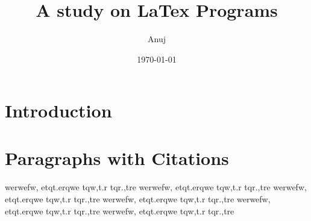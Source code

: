 \documentclass[10pt, a4paper]{article}
\begin{document}
\title{A study on LaTex Programs}
\author{Anuj}
\date{\today}
\maketitle
\section*{Introduction}
\lipsum[66]

\section{Paragraphs with Citations}
\paragraph{}
\lipsum[66] \cite{cite1} \lipsum[66] \cite{cite2} \lipsum[66] \cite{cite3} 

\paragraph{}
\lipsum[66] \cite{cite4} \lipsum[66] \cite{cite5} \lipsum[66] \cite{cite6}

\begin{thebibliography}{10}
 werwefw, etqt.erqwe tqw,t.r tqr.,tre 
 werwefw, etqt.erqwe tqw,t.r tqr.,tre 
 werwefw, etqt.erqwe tqw,t.r tqr.,tre 
 werwefw, etqt.erqwe tqw,t.r tqr.,tre 
 werwefw, etqt.erqwe tqw,t.r tqr.,tre 
 werwefw, etqt.erqwe tqw,t.r tqr.,tre 
\end{thebibliography}
\end{document}
